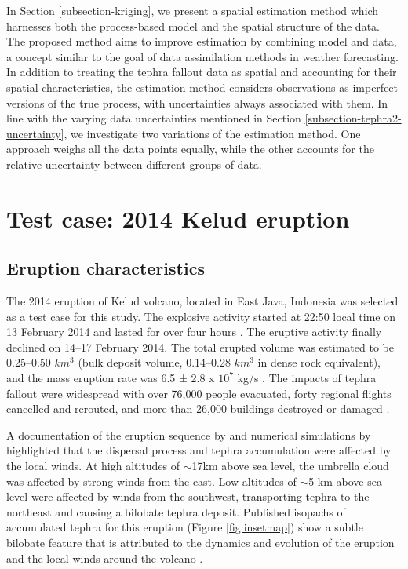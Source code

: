 \documentclass[a4paper,fleqn]{cas-sc}
\begin{document}
In Section \ref{subsection-kriging}, we present a spatial estimation method which harnesses both the process-based model and the spatial structure of the data. The proposed method aims to improve estimation by combining model and data, a concept similar to the goal of data assimilation methods in weather forecasting. In addition to treating the tephra fallout data as spatial and accounting for their spatial characteristics, the estimation method considers observations as imperfect versions of the true process, with uncertainties always associated with them. In line with the varying data uncertainties mentioned in Section \ref{subsection-tephra2-uncertainty}, we investigate two variations of the estimation method. One approach weighs all the data points equally, while the other accounts for the relative uncertainty between different groups of data.

\section{Test case: 2014 Kelud eruption}\label{section-tephra2}

\subsection{Eruption characteristics}

The 2014 eruption of Kelud volcano, located in East Java, Indonesia was selected as a test case for this study. The explosive activity started at 22:50 local time on 13 February 2014 and lasted for over four hours \citep{global_volc}. The eruptive activity finally declined on 14–17 February 2014. The total erupted volume was estimated to be 0.25–0.50 $km^{3}$ (bulk deposit volume, 0.14–0.28 $km^{3}$ in dense rock equivalent), and the mass eruption rate was 6.5 ± 2.8 x $10^{7}$ kg/s \citep{MAENO201924}. The impacts of tephra fallout were widespread with over 76,000 people evacuated, forty regional flights cancelled and rerouted, and more than 26,000 buildings destroyed or damaged \citep{global_volc, williams2020, ifrc2014}. 

A documentation of the eruption sequence by \cite{MAENO201924} and numerical simulations by \cite{tanaka2016numerical} highlighted that the dispersal process and tephra accumulation were affected by the local winds. At high altitudes of $\sim$17km above sea level, the umbrella cloud was affected by strong winds from the east. Low altitudes of $\sim$5 km above sea level were affected by winds from the southwest, transporting tephra to the northeast and causing a bilobate tephra deposit. Published isopachs of accumulated tephra for this eruption (Figure \ref{fig:insetmap}) show a subtle bilobate feature that is attributed to the dynamics and evolution of the eruption and the local winds around the volcano \citep{MAENO201924}. 
\end{document}
